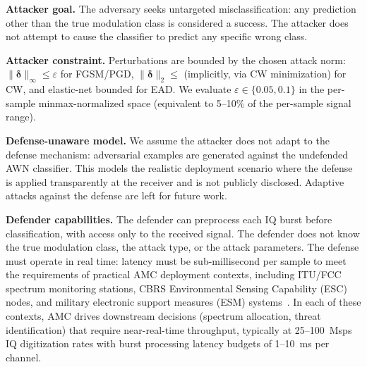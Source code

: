 \textbf{Attacker goal.} The adversary seeks untargeted misclassification: any
prediction other than the true modulation class is considered a success. The
attacker does not attempt to cause the classifier to predict any specific wrong
class.

\textbf{Attacker constraint.} Perturbations are bounded by the chosen
attack norm: $\|\boldsymbol{\delta}\|_\infty \leq \varepsilon$ for FGSM/PGD,
$\|\boldsymbol{\delta}\|_2 \leq$ (implicitly, via CW minimization) for CW, and
elastic-net bounded for EAD. We evaluate $\varepsilon \in \{0.05, 0.1\}$ in
the per-sample minmax-normalized space (equivalent to 5--10\% of the
per-sample signal range).

\textbf{Defense-unaware model.} We assume the attacker does not adapt to the
defense mechanism: adversarial examples are generated against the undefended
AWN classifier. This models the realistic deployment scenario where the defense
is applied transparently at the receiver and is not publicly disclosed. Adaptive
attacks against the defense are left for future work.

\textbf{Defender capabilities.} The defender can preprocess each IQ burst
before classification, with access only to the received signal. The defender
does not know the true modulation class, the attack type, or the attack
parameters. The defense must operate in real time: latency must be sub-millisecond
per sample to meet the requirements of practical AMC deployment contexts,
including ITU/FCC spectrum monitoring stations, CBRS Environmental Sensing
Capability (ESC) nodes, and military electronic support measures (ESM)
systems~\cite{proakis2008digital}. In each of these contexts, AMC drives
downstream decisions (spectrum allocation, threat identification) that require
near-real-time throughput, typically at 25--100~Msps IQ digitization rates with
burst processing latency budgets of 1--10~ms per channel.

